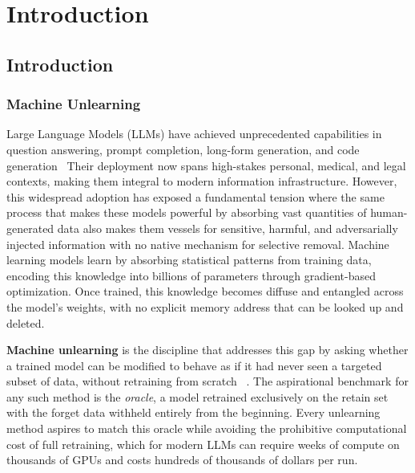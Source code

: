 \chapter{Introduction}

\section{Introduction}\label{sec:intro}

\subsection{Machine Unlearning}\label{subsec:mu_definition}

Large Language Models (LLMs) have achieved unprecedented capabilities in question answering, prompt completion, long-form generation, and code generation~\citeauthor{kumar2024large} \citeauthor{huang2023look} \citeauthor{chen2025putting} \citeauthor{li2024can} \citeauthor{rachapudi2026bid} Their deployment now spans high-stakes personal, medical, and legal contexts, making them integral to modern information infrastructure. However, this widespread adoption has exposed a fundamental tension where the same process that makes these models powerful by absorbing vast quantities of human-generated data also makes them vessels for sensitive, harmful, and adversarially injected information with no native mechanism for selective removal. Machine learning models learn by absorbing statistical patterns from training data, encoding this knowledge into billions of parameters through gradient-based optimization. Once trained, this knowledge becomes diffuse and entangled across the model's weights, with no explicit memory address that can be looked up and deleted.

\textbf{Machine unlearning} is the discipline that addresses this gap by asking whether a trained model can be modified to behave as if it had never seen a targeted subset of data, without retraining from scratch~\citeauthor{zhang2024negative} \citeauthor{wang2024llm} \citeauthor{wang2025rethinking}. The aspirational benchmark for any such method is the \textit{oracle}, a model retrained exclusively on the retain set with the forget data withheld entirely from the beginning. Every unlearning method aspires to match this oracle while avoiding the prohibitive computational cost of full retraining, which for modern LLMs can require weeks of compute on thousands of GPUs and costs hundreds of thousands of dollars per run.

